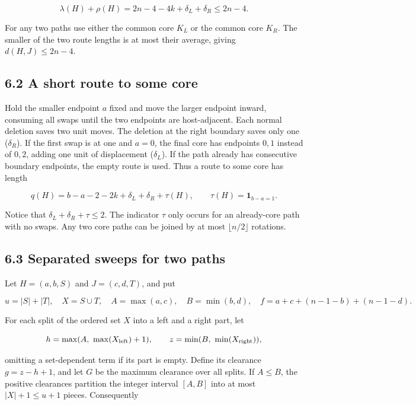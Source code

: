\documentclass[11pt,a4paper]{article}
\begin{document}
\[ \lambda(H)+\rho(H)=2n-4-4k+\delta_L+\delta_R\le2n-4. \]

For any two paths use either the common core \(K_L\) or the common core \(K_R\). The smaller of the two route lengths is at most their average, giving \(d(H,J)\le2n-4\).

\hypertarget{a-short-route-to-some-core}{%
\subsection{6.2 A short route to some core}\label{a-short-route-to-some-core}}

Hold the smaller endpoint \(a\) fixed and move the larger endpoint inward, consuming all swaps until the two endpoints are host-adjacent. Each normal deletion saves two unit moves. The deletion at the right boundary saves only one (\(\delta_R\)). If the first swap is at one and \(a=0\), the final core has endpoints \(0,1\) instead of \(0,2\), adding one unit of displacement (\(\delta_L\)). If the path already has consecutive boundary endpoints, the empty route is used. Thus a route to some core has length

\[ q(H)=b-a-2-2k+\delta_L+\delta_R+\tau(H),\qquad
\tau(H)=\mathbf1_{b-a=1}. \]

Notice that \(\delta_L+\delta_R+\tau\le2\). The indicator \(\tau\) only occurs for an already-core path with no swaps. Any two core paths can be joined by at most \(\lfloor n/2\rfloor\) rotations.

\hypertarget{separated-sweeps-for-two-paths}{%
\subsection{6.3 Separated sweeps for two paths}\label{separated-sweeps-for-two-paths}}

Let \(H=(a,b,S)\) and \(J=(c,d,T)\), and put

\[ u=|S|+|T|,\quad X=S\cup T,\quad
A=\max(a,c),\quad B=\min(b,d),\quad
f=a+c+(n-1-b)+(n-1-d). \]

For each split of the ordered set \(X\) into a left and a right part, let

\[ h=\max(A,\ \max(X_{\rm left})+1),\qquad
z=\min(B,\ \min(X_{\rm right})), \]

omitting a set-dependent term if its part is empty. Define its clearance \(g=z-h+1\), and let \(G\) be the maximum clearance over all splits. If \(A\le B\), the positive clearances partition the integer interval \([A,B]\) into at most \(|X|+1\le u+1\) pieces. Consequently
\end{document}
